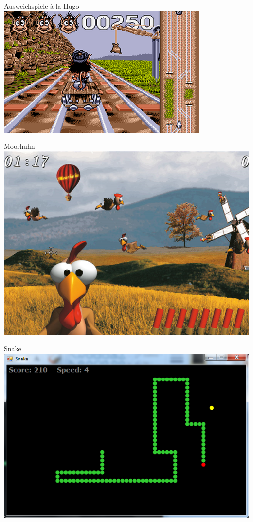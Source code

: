 \begin{minipage}{.45\textwidth}
\begin{center}Ausweichspiele à la Hugo\\\vspace{4ex}\includegraphics[width=.4\textwidth]{img_hugo.png}\end{center}
\begin{center}Moorhuhn\\\vspace{4ex}\includegraphics[width=.4\textwidth]{img_moorhuhn.png}\end{center}
\begin{center}Snake\\\vspace{4ex}\includegraphics[width=.4\textwidth]{img_snake.png}\end{center}

\end{minipage}



